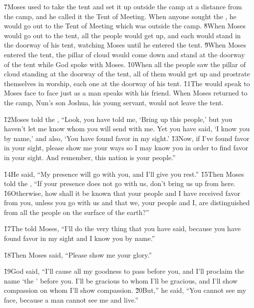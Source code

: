 \v{7}Moses used to take the tent and set it up outside the camp at a distance from the camp, and he called it the Tent of Meeting. When anyone sought the , he would go out to the Tent of Meeting which was outside the camp. \v{8}When Moses would go out to the tent, all the people would get up, and each would stand in the doorway of his tent, watching Moses until he entered the tent. \v{9}When Moses entered the tent, the pillar of cloud would come down and stand at the doorway of the tent while God spoke with Moses. \v{10}When all the people saw the pillar of cloud standing at the doorway of the tent, all of them would get up and prostrate themselves in worship, each one at the doorway of his tent. \v{11}The  would speak to Moses face to face just as a man speaks with his friend. When Moses returned to the camp, Nun's son Joshua, his young servant, would not leave the tent.

\v{12}Moses told the , ``Look, you have told me, `Bring up this people,' but you haven't let me know whom you will send with me. Yet you have said, `I know you by name,' and also, `You have found favor in my sight.' \v{13}Now, if I've found favor in your sight, please show me your ways so I may know you in order to find favor in your sight. And remember, this nation is your people.''

\v{14}He said, ``My presence will go with you, and I'll give you rest.'' \v{15}Then Moses told the , ``If your presence does not go with us, don't bring us up from here. \v{16}Otherwise, how shall it be known that your people and I have received favor from you, unless you go with us and that we, your people and I, are distinguished from all the people on the surface of the earth?''

\v{17}The  told Moses, ``I'll do the very thing that you have said, because you have found favor in my sight and I know you by name.''

\v{18}Then Moses said, ``Please show me your glory.''

\v{19}God said, ``I'll cause all my goodness to pass before you, and I'll proclaim the name `the ' before you. I'll be gracious to whom I'll be gracious, and I'll show compassion on whom I'll show compassion. \v{20}But,'' he said, ``You cannot see my face, because a man cannot see me and live.''

